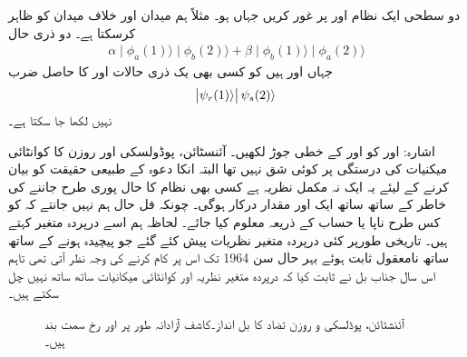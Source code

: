 دو سطحی ایک نظام  اور  پر غور کریں جہاں  ہو۔ مثلاً  ہم میدان اور  خلاف میدان کو ظاہر کرسکتا ہے۔ دو ذری حال 
\begin{align*}
	\alpha\mid\phi_a(1)\rangle\mid\phi_b(2)\rangle+\beta\mid\phi_b(1)\rangle\mid\phi_a(2)\rangle
\end{align*}
جہاں  اور  ہیں کو کسی بھی یک ذری حالات  اور  کا حاصل ضرب
\begin{align*}
	\abs{\psi_r(1)\rangle}\psi_s(2)\rangle
\end{align*}
نہیں لکھا جا سکتا ہے۔

اشارہ:  اور  کو  اور  کے خطی جوڑ لکھیں۔
آئنسٹائن، پوڈولسکی اور روزن کا کوانٹائی میکنیات کی درستگی پر کوئی شق نہیں تھا البتہ انکا دعوہ کے طبیعی حقیقت کو بیان کرنے کے لیئے یہ ایک نہ مکمل نظریہ ہے کسی بھی نظام کا حال پوری طرح جاننے کی خاطر  کے ساتھ ساتھ ایک اور مقدار  درکار ہوگی۔ چونکہ فل حال ہم نہیں جانتے کہ  کو کس طرح ناپا یا حساب کے ذریعہ معلوم کیا جائے۔ لحاظہ ہم اسے درپردہ متغیر کہتے ہیں۔ تاریخی طورپر کئی درپردہ متغیر نظریات پیش کئے گئے جو پیچیدہ ہونے کے ساتھ ساتھ نامعقول ثابت ہوئے بہر حال سن \num{1964} تک اس پر کام کرنے کی وجہ نظر آتی تھی تاہم اس سال جناب بل نے ثابت کیا کہ درپردہ متغیر نظریہ اور کوانٹائی میکانیات ساتھ ساتھ نہیں چل سکتے ہیں۔

\begin{figure}
\centering
{}
\caption{آئنشٹائن، پوڈلسکی و  روزن  تضاد کا بل  انداز۔کاشف آزادانہ طور پر  اور  رخ سمت بند ہیں۔}
\label{شکل_بکھراو_بل_انداز}
\end{figure}


